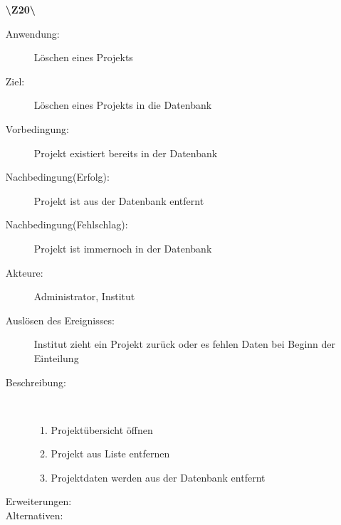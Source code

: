 \documentclass[a4paper]{article}
\begin{document}
\begin{enumerate}
  \item[\textbf{\textbackslash Z20\textbackslash}] \begin{description}
  \item[Anwendung:] Löschen eines Projekts
  \item[Ziel:] Löschen eines Projekts in die Datenbank
  	\item[Vorbedingung:] Projekt existiert bereits in der Datenbank
  	\item[Nachbedingung(Erfolg):] Projekt ist aus der Datenbank entfernt
  	\item[Nachbedingung(Fehlschlag):] Projekt ist immernoch in der Datenbank
  	\item[Akteure:] Administrator, Institut
  	\item[Auslösen des Ereignisses:] Institut zieht ein Projekt zurück oder es
  	fehlen Daten bei Beginn der Einteilung
  	\item[Beschreibung:]~
  	\begin{enumerate}[1.]
  	  \item Projektübersicht öffnen
  	  \item Projekt aus Liste entfernen
  	  \item Projektdaten werden aus der Datenbank entfernt
  	\end{enumerate}
  	\item[Erweiterungen:]
  	\item[Alternativen:]
  \end{description}
  \pagebreak
  

\end{enumerate}
\end{document}
